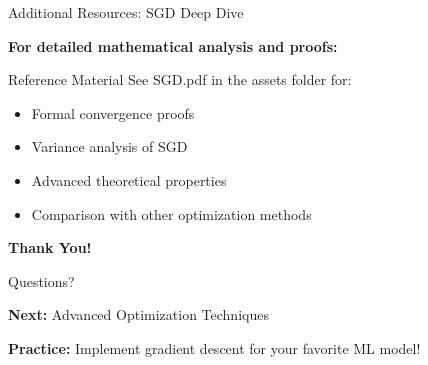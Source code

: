 \documentclass[usenames,dvipsnames]{beamer}
\begin{document}
  \begin{frame}{Additional Resources: SGD Deep Dive}
    \begin{center}
    \textbf{For detailed mathematical analysis and proofs:}
    \end{center}
    
    \begin{alertbox}{Reference Material}
    See SGD.pdf in the assets folder for:
    \begin{itemize}
        \item Formal convergence proofs
        \item Variance analysis of SGD
        \item Advanced theoretical properties
        \item Comparison with other optimization methods
    \end{itemize}
    \end{alertbox}
  \end{frame}

  

  \begin{frame}
    \centering
    \Huge \textbf{Thank You!}
    
    \vspace{1cm}
    \Large Questions?
    
    \vspace{1cm}
    \normalsize
    \textbf{Next:} Advanced Optimization Techniques
    
    \textbf{Practice:} Implement gradient descent for your favorite ML model!
  \end{frame}
\end{document}
